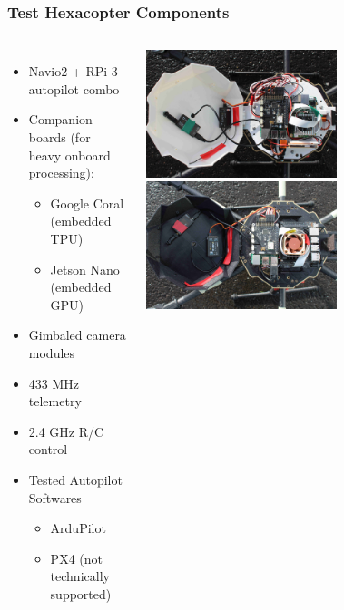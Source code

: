 \documentclass[aspectratio=169]{rubeamer}
\newif\ifpause
\newcommand{\mypause}{\ifpause \pause \fi}
\begin{document}
\begin{frame}
  \frametitle{Test Hexacopter Components}
  \begin{columns}
    \begin{itemize}
      \item Navio2 + RPi 3 autopilot combo
      \mypause
      \item Companion boards (for heavy onboard processing):
      \begin{itemize}
        \mypause
        \item Google Coral (embedded TPU)
        \mypause
        \item Jetson Nano (embedded GPU)
      \end{itemize}
      \mypause
      \item Gimbaled camera modules
      \mypause
      \item 433 MHz telemetry
      \mypause
      \item 2.4 GHz R/C control
      \mypause
      \item Tested Autopilot Softwares
      \begin{itemize}
        \item ArduPilot
        \mypause
        \item PX4 (not technically supported)
      \end{itemize}
    \end{itemize}
    \centering
    \onslide
    \includegraphics[width=0.6\textwidth]{coral_electronics}\\
    \includegraphics[width=0.6\textwidth]{jetson_electronics}\\
  \end{columns}
\end{frame}
\end{document}
